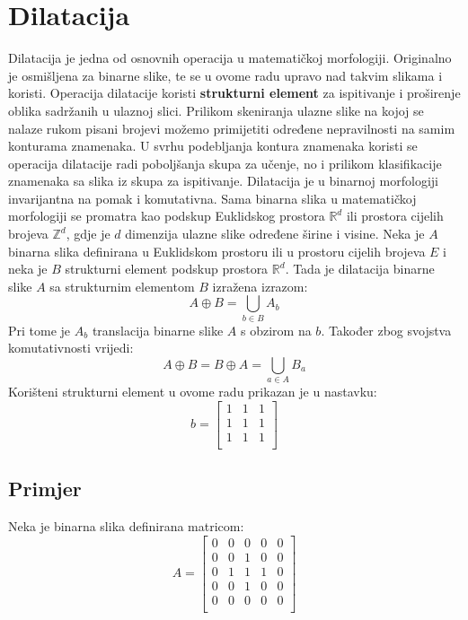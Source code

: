 \documentclass[times, utf8, diplomski]{fer}
\theoremstyle{definition}
\begin{document}
\section{Dilatacija}
Dilatacija je jedna od osnovnih operacija u matematičkoj morfologiji. Originalno je osmišljena za binarne slike, te se u ovome radu upravo nad takvim slikama i koristi. Operacija dilatacije koristi \textbf{strukturni element} za ispitivanje i proširenje oblika sadržanih u ulaznoj slici. Prilikom skeniranja ulazne slike na kojoj se nalaze rukom pisani brojevi možemo primijetiti određene nepravilnosti na samim konturama znamenaka. U svrhu podebljanja kontura znamenaka koristi se operacija dilatacije radi poboljšanja skupa za učenje, no i prilikom klasifikacije znamenaka sa slika iz skupa za ispitivanje. \newline
Dilatacija je u binarnoj morfologiji invarijantna na pomak i komutativna. Sama binarna slika u matematičkoj morfologiji se promatra kao podskup Euklidskog prostora ${\mathbb{R}^d}$ ili prostora cijelih brojeva $\mathbb{Z}^d$, gdje je $d$ dimenzija ulazne slike određene širine i visine. Neka je $A$ binarna slika definirana u Euklidskom prostoru ili u prostoru cijelih brojeva $E$ i neka je $B$ strukturni element podskup prostora ${\mathbb{R}^d}$. Tada je dilatacija binarne slike $A$ sa strukturnim elementom $B$ izražena izrazom:
\begin{equation}
A \oplus B = \bigcup_{b \in B} A_b
\end{equation}
Pri tome je $A_b$ translacija binarne slike $A$ s obzirom na $b$. Također zbog svojstva komutativnosti vrijedi:
\begin{equation}
A \oplus B = B \oplus A = \bigcup_{a \in A} B_a
\end{equation}
Korišteni strukturni element u ovome radu prikazan je u nastavku:
\[
b=
\begin{bmatrix}
1 & 1 & 1 \\
1 & 1 & 1 \\
1 & 1 & 1 \\
\end{bmatrix}
\]
\subsection{Primjer}
Neka je binarna slika definirana matricom:
\[
A=
\begin{bmatrix}
0 & 0 & 0 & 0 & 0 \\
0 & 0 & 1 & 0 & 0 \\
0 & 1 & 1 & 1 & 0 \\
0 & 0 & 1 & 0 & 0 \\
0 & 0 & 0 & 0 & 0 \\

\end{bmatrix}
\]
\end{document}

